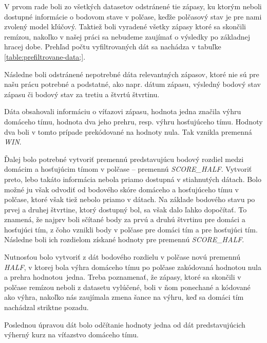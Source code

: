 \documentclass[
  digital, %
  oneside, %
  notable,   %
  lof,     %
  lot,     %
]{fithesis3}
\begin{document}
		V prvom rade boli zo všetkých datasetov odstránené tie zápasy, ku ktorým neboli dostupné informácie o bodovom stave v polčase, keďže polčasový stav je pre nami zvolený model kľúčový. Taktiež boli vyradené všetky zápasy ktoré sa skončili remízou, nakoľko v našej práci sa nebudeme zaujímať o výsledky po základnej hracej dobe. Prehľad počtu vyfiltrovaných dát sa nachádza v tabuľke \ref{table:prefiltrovane-data;}.
		
		Následne boli odstránené nepotrebné dáta relevantných zápasov, ktoré nie sú pre našu prácu potrebné a podstatné, ako napr. dátum zápasu, výsledný bodový stav zápasu či bodový stav za tretiu a štvrtú štvrtinu.
		
		Dáta obsahovali informáciu o víťazovi zápasu, hodnota jedna značila výhru domáceho tímu, hodnota dva jeho prehru, resp. výhru hosťujúceho tímu. Hodnoty dva boli v tomto prípade prekódované na hodnoty nula. Tak vznikla premenná \textit{WIN}.
		
		Ďalej bolo potrebné vytvoriť premennú predstavujúcu bodový rozdiel medzi domácim a hosťujúcim tímom v polčase – premennú \textit{SCORE\_HALF}. Vytvoriť preto, lebo takáto informácia nebola priamo dostupná v stiahnutých dátach. Bolo možné ju však odvodiť od  bodového skóre domáceho a hosťujúceho tímu v polčase, ktoré však tiež nebolo priamo v dátach. Na základe bodového stavu po prvej a druhej štvrtine, ktorý dostupný bol, sa však dalo ľahko dopočítať. To znamená, že najprv boli sčítané body za prvú a druhú štvrtinu pre domáci a hosťujúci tím, z čoho vznikli body v polčase pre domáci tím a pre hosťujúci tím. Následne boli ich rozdielom získané hodnoty pre premennú \textit{SCORE\_HALF}. 
		
		Nutnosťou bolo vytvoriť z dát bodového rozdielu v polčase novú premennú \textit{HALF}, v ktorej bola výhra domáceho tímu po polčase zakódovaná hodnotou nula a prehra hodnotou~jedna. Treba poznamenať, že zápasy, ktoré sa skončili v polčase remízou neboli z datasetu vylúčené, boli v ňom ponechané a kódované ako výhra, nakoľko nás zaujímala zmena šance na výhru, keď sa domáci tím nachádzal striktne pozadu.
		
		Poslednou úpravou dát bolo odčítanie hodnoty jedna od dát predstavujúcich výherný kurz na víťazstvo domáceho tímu.
	
\end{document}
